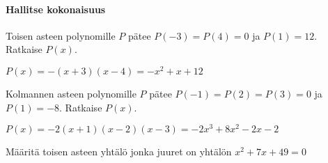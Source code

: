\begin{tehtavasivu}
\paragraph*{Hallitse kokonaisuus}

\begin{tehtava}
    Toisen asteen polynomille $P$ pätee $P(-3)=P(4)=0$ ja $P(1)=12$. Ratkaise $P(x)$.
    \begin{vastaus}
        $P(x)=-(x+3)(x-4)=-x^2+x+12$
    \end{vastaus}
\end{tehtava}

\begin{tehtava}
    Kolmannen asteen polynomille $P$ pätee $P(-1)=P(2)=P(3)=0$ ja $P(1)=-8$. Ratkaise $P(x)$.
    \begin{vastaus}
        $P(x)=-2(x+1)(x-2)(x-3)=-2x^3+8x^2-2x-2$
    \end{vastaus}
\end{tehtava}

\begin{tehtava}
   Määritä toisen asteen yhtälö jonka juuret on yhtälön $ x^2+7x+49 =0 $ 
 \begin{alakohdat}
    \end{alakohdat}
    \begin{vastaus}
        \begin{alakohdat}
        \end{alakohdat}
    \end{vastaus}
\end{tehtava}

\end{tehtavasivu}
